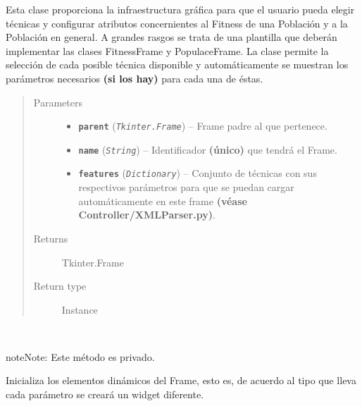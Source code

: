 \documentclass[class=report, crop=false]{standalone}
\begin{document}
\begin{fulllineitems}

\begin{DUlineblock}{0em}
\item[] Esta clase proporciona la infraestructura gráfica para que el 
usuario pueda  elegir técnicas y configurar atributos 
concernientes al Fitness de una Población y a la Población 
en general.\break
A grandes rasgos se trata de una plantilla que deberán implementar 
las clases FitnessFrame y PopulaceFrame.\break
La clase permite la selección de cada posible técnica disponible y 
automáticamente se muestran los parámetros necesarios \textbf{(si los hay)} 
para cada una de éstas.
\end{DUlineblock}

\begin{quote}\begin{description}
\item[{Parameters}] \leavevmode\begin{itemize}
\item \textbf{\texttt{parent}} (\emph{\texttt{Tkinter.Frame}}) -- Frame padre al que pertenece.
\item \textbf{\texttt{name}} (\emph{\texttt{String}}) -- Identificador \textbf{(único)} que tendrá el Frame.
\item \textbf{\texttt{features}} (\emph{\texttt{Dictionary}}) -- Conjunto de técnicas con sus respectivos parámetros para que se puedan cargar automáticamente en este frame \textbf{(véase Controller/XMLParser.py)}.
\end{itemize}

\item[{Returns}] \leavevmode
Tkinter.Frame
\item[{Return type}] \leavevmode
Instance
\end{description}\end{quote}


\begin{fulllineitems}

~

\begin{notice}{note}{Note:}
Este método es privado.
\end{notice}

Inicializa los elementos dinámicos del Frame, esto es, de 
acuerdo al tipo que lleva cada parámetro se creará un widget 
diferente.


\end{fulllineitems}
\end{fulllineitems}
\end{document}
